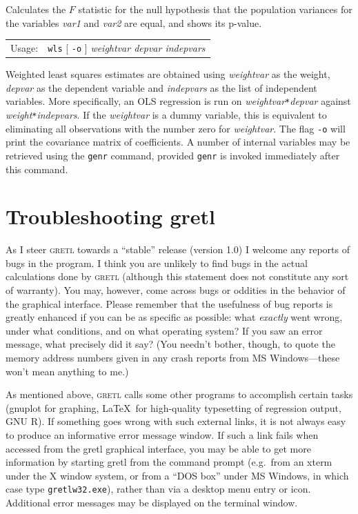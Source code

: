 \documentclass{article}
\begin{document}
{Calculates the $F$ statistic for the null hypothesis that the
population variances for the variables \textit{var1} and \textit{var2}
are equal, and shows its p-value.


\begin{tabular}{ll}
Usage: & \texttt{wls} [ \texttt{-o} ]
     \textit{weightvar depvar indepvars}   \\
\end{tabular}

Weighted least squares estimates are obtained using \textit{weightvar}
as the weight, \textit{depvar} as the dependent variable and
\textit{indepvars} as the list of independent variables.  More
specifically, an OLS regression is run on
\textit{weightvar}\texttt{*}\textit{depvar} against
\textit{weight}\texttt{*}\textit{indepvars}.  If the \textit{weightvar}
is a dummy variable, this is equivalent to eliminating all
observations with the number zero for \textit{weightvar}.  The flag
\texttt{-o} will print the covariance matrix of coefficients.  A
number of internal variables may be retrieved using the \texttt{genr}
command, provided \texttt{genr} is invoked immediately after this
command.

} %

\clearpage
\section{Troubleshooting gretl}
\label{trouble}

As I steer \textsc{gretl} towards a ``stable'' release (version 1.0) I
welcome any reports of bugs in the program.  I think you are unlikely
to find bugs in the actual calculations done by \textsc{gretl}
(although this statement does not constitute any sort of warranty).
You may, however, come across bugs or oddities in the behavior of the
graphical interface.  Please remember that the usefulness of bug
reports is greatly enhanced if you can be as specific as possible:
what \textit{exactly} went wrong, under what conditions, and on what
operating system?  If you saw an error message, what precisely did it
say?  (You needn't bother, though, to quote the memory address numbers
given in any crash reports from MS Windows---these won't mean anything
to me.)

As mentioned above, \textsc{gretl} calls some other programs to
accomplish certain tasks (gnuplot for graphing, \LaTeX\ for
high-quality typesetting of regression output, GNU R).  If something
goes wrong with such external links, it is not always easy to produce
an informative error message window.  If such a link fails when
accessed from the \textsf{gretl} graphical interface, you may be able
to get more information by starting \textsf{gretl} from the command
prompt (e.g.\ from an xterm under the X window system, or from a ``DOS
box'' under MS Windows, in which case type \texttt{gretlw32.exe}),
rather than via a desktop menu entry or icon.  Additional error
messages may be displayed on the terminal window.
\end{document}
